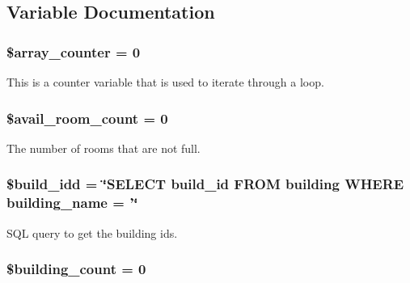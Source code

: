 \subsection{\-Variable \-Documentation}
\hypertarget{admin__view_2index_8php_a23bfd2b4e40b92a4e1df61a3752528d5}{
\subsubsection[{\$array\-\_\-counter}]{\setlength{\rightskip}{0pt plus 5cm}\$array\-\_\-counter = 0}}\label{admin__view_2index_8php_a23bfd2b4e40b92a4e1df61a3752528d5}
\-This is a counter variable that is used to iterate through a loop. \hypertarget{admin__view_2index_8php_a02eb1848bf44216bfff32490e891d18a}{
\subsubsection[{\$avail\-\_\-room\-\_\-count}]{\setlength{\rightskip}{0pt plus 5cm}\$avail\-\_\-room\-\_\-count = 0}}\label{admin__view_2index_8php_a02eb1848bf44216bfff32490e891d18a}
\-The number of rooms that are not full. \hypertarget{admin__view_2index_8php_a6671599aee303444a6ccd2d2226630dd}{
\subsubsection[{\$build\-\_\-idd}]{\setlength{\rightskip}{0pt plus 5cm}\$build\-\_\-idd = \char`\"{}\-S\-E\-L\-E\-C\-T build\-\_\-id \-F\-R\-O\-M building \-W\-H\-E\-R\-E building\-\_\-name = '\char`\"{}}}\label{admin__view_2index_8php_a6671599aee303444a6ccd2d2226630dd}
\-S\-Q\-L query to get the building ids. \hypertarget{admin__view_2index_8php_abcc551d7bb78645ca485dd1332f3637a}{
\subsubsection[{\$building\-\_\-count}]{\setlength{\rightskip}{0pt plus 5cm}\$building\-\_\-count = 0}}\label{admin__view_2index_8php_abcc551d7bb78645ca485dd1332f3637a}
